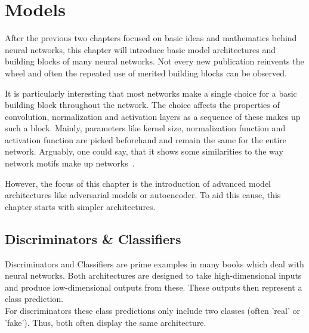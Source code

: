 \setchapterpreamble[u]{\margintoc}
\chapter{Models}
After the previous two chapters focused on basic ideas and mathematics behind neural networks, this chapter will introduce basic model architectures and building blocks of many neural networks.
Not every new publication reinvents the wheel and often the repeated use of merited building blocks can be observed.

It is particularly interesting that most networks make a single choice for a basic building block throughout the network.
The choice affects the properties of convolution, normalization and activation layers as a sequence of these makes up such a block.
Mainly, parameters like kernel size, normalization function and activation function are picked beforehand and remain the same for the entire network.
Arguably, one could say, that it shows some similarities to the way network motifs make up networks~\cite{uri_alon}.

However, the focus of this chapter is the introduction of advanced model architectures like adversarial models or autoencoder.
To aid this cause, this chapter starts with simpler architectures.

\section{Discriminators \& Classifiers}
Discriminators and Classifiers are prime examples in many books which deal with neural networks.
Both architectures are designed to take high-dimensional inputs and produce low-dimensional outputs from these.
These outputs then represent a class prediction. \\
For discriminators these class predictions only include two classes (often 'real' or 'fake').
Thus, both often display the same architecture.

